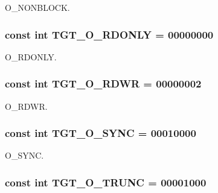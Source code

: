 O\_\-NONBLOCK. \hypertarget{classX86Linux64_ad266b23a0ae07d1833e18bae651f3411}{
\subsubsection[{TGT\_\-O\_\-RDONLY}]{\setlength{\rightskip}{0pt plus 5cm}const int {\bf TGT\_\-O\_\-RDONLY} = 00000000}}
\label{classX86Linux64_ad266b23a0ae07d1833e18bae651f3411}


O\_\-RDONLY. \hypertarget{classX86Linux64_ac6fa9ecf5d2f3314f197698f1099e2ac}{
\subsubsection[{TGT\_\-O\_\-RDWR}]{\setlength{\rightskip}{0pt plus 5cm}const int {\bf TGT\_\-O\_\-RDWR} = 00000002}}
\label{classX86Linux64_ac6fa9ecf5d2f3314f197698f1099e2ac}


O\_\-RDWR. \hypertarget{classX86Linux64_abf43ab05d2a5b6b8113952160d8565db}{
\subsubsection[{TGT\_\-O\_\-SYNC}]{\setlength{\rightskip}{0pt plus 5cm}const int {\bf TGT\_\-O\_\-SYNC} = 00010000}}
\label{classX86Linux64_abf43ab05d2a5b6b8113952160d8565db}


O\_\-SYNC. \hypertarget{classX86Linux64_a4f892ee6e1424a2becd859b0bef1f18b}{
\subsubsection[{TGT\_\-O\_\-TRUNC}]{\setlength{\rightskip}{0pt plus 5cm}const int {\bf TGT\_\-O\_\-TRUNC} = 00001000}}
\label{classX86Linux64_a4f892ee6e1424a2becd859b0bef1f18b}


